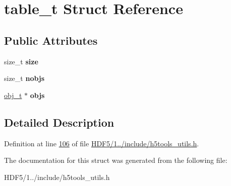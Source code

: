 \hypertarget{structtable__t}{}\section{table\+\_\+t Struct Reference}
\label{structtable__t}
\subsection*{Public Attributes}
\begin{DoxyCompactItemize}
\item 
\mbox{\label{structtable__t_addeef814536940b5ab23a4d1632759dd}} 
size\+\_\+t {\bfseries size}
\item 
\mbox{\label{structtable__t_a4f071e9bbcf994fd8522cae80ce1f5fd}} 
size\+\_\+t {\bfseries nobjs}
\item 
\mbox{\label{structtable__t_a821fe488e459aa38a28292c742d90e5d}} 
\hyperlink{structobj__t}{obj\+\_\+t} $\ast$ {\bfseries objs}
\end{DoxyCompactItemize}


\subsection{Detailed Description}


Definition at line \hyperlink{_h_d_f5_21_810_81_2include_2h5tools__utils_8h_source_l00106}{106} of file \hyperlink{_h_d_f5_21_810_81_2include_2h5tools__utils_8h_source}{H\+D\+F5/1../include/h5tools\+\_\+utils.\+h}.



The documentation for this struct was generated from the following file\+:\begin{DoxyCompactItemize}
\item 
H\+D\+F5/1../include/h5tools\+\_\+utils.\+h\end{DoxyCompactItemize}
